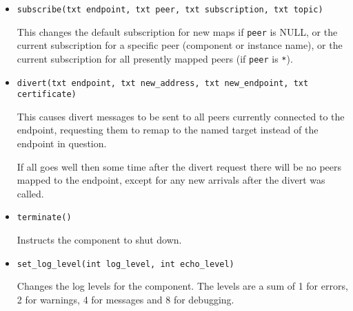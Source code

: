 \documentclass[12pt,a4paper,twoside]{article}
\renewcommand{\_}{\texttt{\symbol{95}}}
\begin{document}
\begin{itemize}
\item \verb^subscribe(txt endpoint, txt peer, txt subscription, txt topic)^

This changes the default subscription for new maps if \verb^peer^ is
NULL, or the current subscription for a specific peer (component or
instance name), or the current subscription for all presently mapped
peers (if \verb^peer^ is \verb^*^).

\item \verb^divert(txt endpoint, txt new_address, txt new_endpoint, txt certificate)^

This causes divert messages to be sent to all peers currently
connected to the endpoint, requesting them to remap to the
named target instead of the endpoint in question.

If all goes well then some time after the divert request there will be no
peers mapped to the endpoint, except for any new arrivals after
the divert was called.

\item \verb^terminate()^

Instructs the component to shut down.


\item \verb^set_log_level(int log_level, int echo_level)^

Changes the log levels for the component. The levels are a sum of
1 for errors, 2 for warnings, 4 for messages and 8 for debugging.


\end{itemize}

% 
% 
%
%
% 
% 
\end{document}
